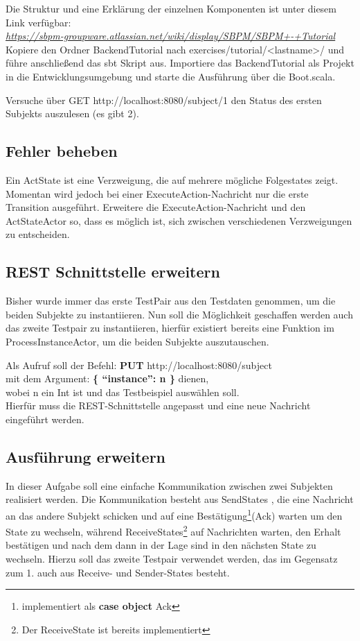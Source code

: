 \documentclass[11pt]{tudexercise}
\newcommand{\link}[1]{\\ \textcolor{blue}{\textit{\url{#1}}}}
\begin{document}
  Die Struktur und eine Erklärung der einzelnen Komponenten ist unter diesem Link verfügbar:
  \link{https://sbpm-groupware.atlassian.net/wiki/display/SBPM/SBPM+-+Tutorial}\\
  Kopiere den Ordner BackendTutorial nach exercises/tutorial/<lastname>/ und führe anschließend das sbt Skript aus.
  Importiere das BackendTutorial als Projekt in die Entwicklungsumgebung und starte die Ausführung
  über die Boot.scala.

  Versuche über GET http://localhost:8080/subject/1 den Status des ersten Subjekts auszulesen (es gibt 2).
  
  \subsection{Fehler beheben}
  Ein ActState ist eine Verzweigung, die auf mehrere mögliche Folgestates zeigt. Momentan wird jedoch bei
  einer ExecuteAction-Nachricht nur die erste Transition ausgeführt. Erweitere die ExecuteAction-Nachricht
  und den ActStateActor so, dass es möglich ist, sich zwischen verschiedenen Verzweigungen zu entscheiden.
  
  \subsection{REST Schnittstelle erweitern}
  Bisher wurde immer das erste TestPair aus den Testdaten genommen, um die beiden Subjekte zu instantiieren.
  Nun soll die Möglichkeit geschaffen werden auch das zweite Testpair zu instantiieren,
  hierfür existiert bereits eine Funktion im ProcessInstanceActor,
  um die beiden Subjekte auszutauschen.
  
  Als Aufruf soll der Befehl:
  \textbf{PUT} http://localhost:8080/subject\\
  mit dem Argument: \textbf{\{ “instance”: n \}} dienen,\\
  wobei n ein Int ist und das Testbeispiel auswählen soll.\\
  Hierfür muss die REST-Schnittstelle angepasst und eine neue Nachricht eingeführt werden.
  
  \subsection{Ausführung erweitern}
  In dieser Aufgabe soll eine einfache Kommunikation zwischen zwei Subjekten realisiert werden.
  Die Kommunikation besteht aus SendStates , die eine Nachricht an das andere Subjekt schicken
  und auf eine Bestätigung\footnote{implementiert als \textbf{case object} Ack}(Ack) warten um den State zu wechseln,
  während ReceiveStates\footnote{Der ReceiveState ist bereits implementiert}
  auf Nachrichten warten, den Erhalt bestätigen und nach dem dann in der Lage sind
  in den nächsten State zu wechseln. Hierzu soll das zweite Testpair verwendet werden,
  das im Gegensatz zum 1. auch aus Receive- und Sender-States besteht.
  
\end{document}

